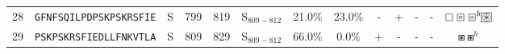 \begin{tabular}{rcccccccccccc}
28 &  \texttt{GFNFSQILPDPSKPSKRSFIE} &       S &    799 &   819 &  S$_{809-812}$ &                          21.0\% &                           23.0\% &          - &           + &          - &           - &                                         $ \boxempty \boxcircle \boxcircle^b \setlength{\fboxsep}{0.5pt} \boxed{\circledast} $ \\
29 &  \texttt{PSKPSKRSFIEDLLFNKVTLA} &       S &    809 &   829 &  S$_{809-812}$ &                          66.0\% &                            0.0\% &          + &           - &          - &           - &                                                                                                         $ \boxast \boxast^b $ \\
\bottomrule
\end{tabular}
